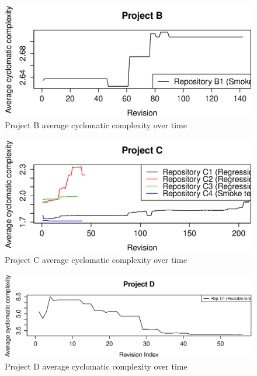 \begin{figure}[!htbp]
    \centering
    \includegraphics[width=\textwidth,keepaspectratio]{figure/results/rq1/project_b_avg_complexity.eps}
    \caption{Project B average cyclomatic complexity over time}
    \label{fig:project_b_avg_complexity}
\end{figure}

\begin{figure}[!htbp]
    \centering
    \includegraphics[width=\textwidth,keepaspectratio]{figure/results/rq1/project_c_avg_complexity.eps}
    \caption{Project C average cyclomatic complexity over time}
    \label{fig:project_c_avg_complexity}
\end{figure}

\begin{figure}[!htbp]
    \centering
    \includegraphics[width=\textwidth,keepaspectratio]{figure/results/rq1/project_d_avg_complexity.eps}
    \caption{Project D average cyclomatic complexity over time}
    \label{fig:project_d_avg_complexity}
\end{figure}

